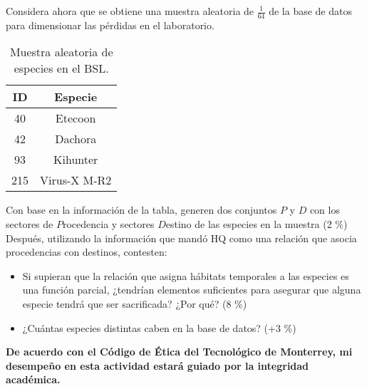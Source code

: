 \documentclass[8pt, onside]{article}
\begin{document}
Considera ahora que se obtiene una muestra aleatoria de $\frac{1}{64}$ de la base de datos para dimensionar las pérdidas en el laboratorio.

\begin{table}[htbp]
    \label{tab:my-table}
    \caption{Muestra aleatoria de especies en el BSL.}
    \centering
    \begin{tabular}{@{}cc@{}}
    \toprule
    ID  & Especie      \\ \midrule
    40  & Etecoon      \\
    42  & Dachora      \\
    93  & Kihunter     \\
    215 & Virus-X M-R2 \\ \bottomrule
    \end{tabular}
\end{table}

Con base en la información de la tabla, generen dos conjuntos $P$ y $D$ con los sectores de $P$rocedencia y sectores $D$estino de las especies en la muestra (2 \%)
Después, utilizando la información que mandó HQ como una relación que asocia procedencias con destinos, contesten:

\begin{itemize}
    \item Si supieran que la relación que asigna hábitats temporales a las especies es una función parcial, ¿tendrían elementos suficientes para asegurar que alguna especie tendrá que ser sacrificada? ¿Por qué? (8 \%)
    \item ¿Cuántas especies distintas caben en la base de datos? (+3 \%)
\end{itemize}

\vfill

\textbf{De acuerdo con el Código de Ética del Tecnológico de Monterrey, mi desempeño en esta actividad estará guiado por la integridad académica.}
\end{document}
